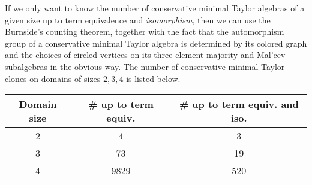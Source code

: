 \documentclass[letterpaper,11pt]{article}
\begin{document}
If we only want to know the number of conservative minimal Taylor algebras of a given size up to term equivalence and \emph{isomorphism}, then we can use the Burnside's counting theorem, together with the fact that the automorphism group of a conservative minimal Taylor algebra is determined by its colored graph and the choices of circled vertices on its three-element majority and Mal'cev subalgebras in the obvious way. The number of conservative minimal Taylor clones on domains of sizes $2,3,4$ is listed below.
\begin{center}
\begin{tabular}{c|c|c}
Domain size & \# up to term equiv. & \# up to term equiv. and iso. \\
\hline
2 & 4 & 3\\
3 & 73 & 19\\
4 & 9829 & 520
\end{tabular}
\end{center}
\end{document}
